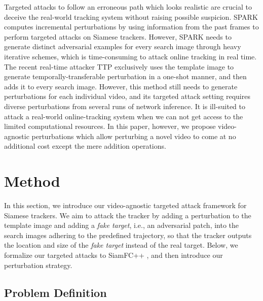 \documentclass[journal]{IEEEtran}
\begin{document}
Targeted attacks to follow an erroneous path which looks realistic are crucial to deceive the real-world tracking system without raising possible suspicion. SPARK \cite{SPARK} computes incremental perturbations by using information from the past frames to perform targeted attacks on Siamese trackers. However, SPARK needs to generate distinct adversarial examples for every search image through heavy iterative schemes, which is time-consuming to attack online tracking in real time. The recent real-time attacker TTP \cite{TTP} exclusively uses the template image to generate temporally-transferable perturbation in a one-shot manner, and then adds it to every search image. However, this method still needs to generate perturbations for each individual video, and its targeted attack setting requires diverse perturbations from several runs of network inference. It is ill-suited to attack a real-world online-tracking system when we can not get access to the limited computational resources. In this paper, however, we propose video-agnostic perturbations which allow perturbing a novel video to come at no additional cost except the mere addition operations.

\section{Method}\label{method}

In this section, we introduce our video-agnostic targeted attack framework for Siamese trackers. We aim to attack the tracker by adding a perturbation to the template image and adding a \textit{fake target}, i.e., an adversarial patch, into the search images adhering to the predefined trajectory, so that the tracker outputs the location and size of the \textit{fake target} instead of the real target. Below, we formalize our targeted attacks to SiamFC++ \cite{SiamFC++}, and then introduce our perturbation strategy.
\vspace{-5mm}
 
\subsection{Problem Definition}\label{problemdefinition}
\end{document}
